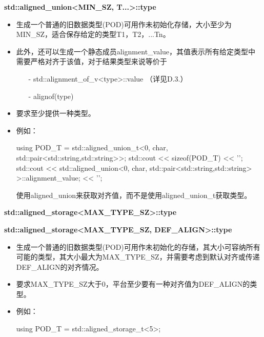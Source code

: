 \textbf{std::aligned\_union<MIN\_SZ, T...>::type}

\begin{itemize}
\item
生成一个普通的旧数据类型(POD)可用作未初始化存储，大小至少为MIN\_SZ，适合保存给定的类型T1，T2，...Tn。

\item
此外，还可以生成一个静态成员alignment\_value，其值表示所有给定类型中需要严格对齐于该值，对于结果类型来说等价于

\begin{itemize}
\item[-]
std::alignment\_of\_v<type>::value （详见D.3.）

\item[-]
alignof(type)
\end{itemize}

\item
要求至少提供一种类型。

\item
例如：
\begin{cpp}
using POD_T = std::aligned_union_t<0, char,
								std::pair<std::string,std::string>>;
std::cout << sizeof(POD_T) << '\n';
std::cout << std::aligned_union<0, char,
								std::pair<std::string,std::string>
								>::alignment_value;
		<< '\n';
\end{cpp}

使用aligned\_union来获取对齐值，而不是使用aligned\_union\_t获取类型。
\end{itemize}

\textbf{std::aligned\_storage<MAX\_TYPE\_SZ>::type}

\textbf{std::aligned\_storage<MAX\_TYPE\_SZ, DEF\_ALIGN>::type}

\begin{itemize}
\item
生成一个普通的旧数据类型(POD)可用作未初始化的存储，其大小可容纳所有可能的类型，其大小最大为MAX\_TYPE\_SZ，并需要考虑到默认对齐或传递DEF\_ALIGN的对齐情况。

\item
要求MAX\_TYPE\_SZ大于0，平台至少要有一种对齐值为DEF\_ALIGN的类型。

\item
例如：
\begin{cpp}
using POD_T = std::aligned_storage_t<5>;
\end{cpp}
\end{itemize}













